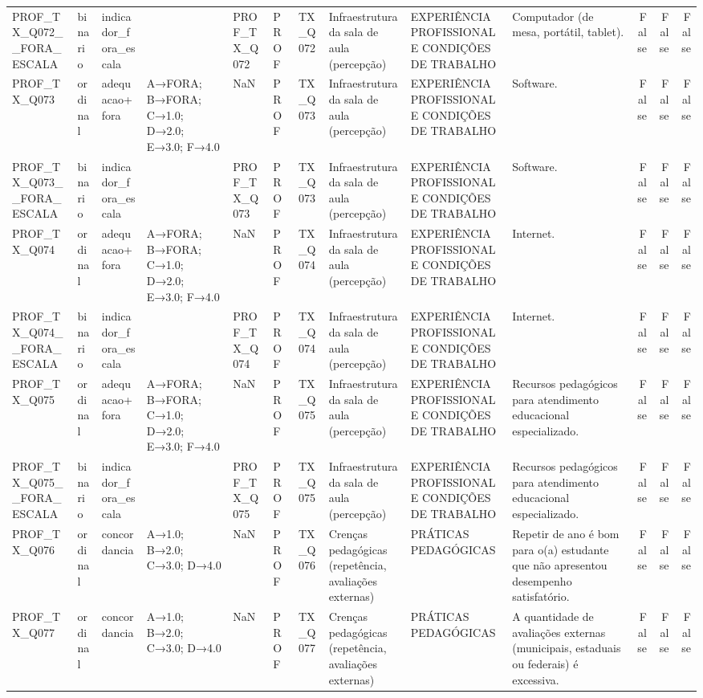 \begin{tabular}{llllllllllrrr}
PROF\_TX\_Q072\_\_FORA\_ESCALA & binario & indicador\_fora\_escala &  & PROF\_TX\_Q072 & PROF & TX\_Q072 & Infraestrutura da sala de aula (percepção) & EXPERIÊNCIA PROFISSIONAL E CONDIÇÕES DE TRABALHO & Computador (de mesa, portátil, tablet). & False & False & False \\
PROF\_TX\_Q073 & ordinal & adequacao+fora & A→FORA; B→FORA; C→1.0; D→2.0; E→3.0; F→4.0 & NaN & PROF & TX\_Q073 & Infraestrutura da sala de aula (percepção) & EXPERIÊNCIA PROFISSIONAL E CONDIÇÕES DE TRABALHO & Software. & False & False & False \\
PROF\_TX\_Q073\_\_FORA\_ESCALA & binario & indicador\_fora\_escala &  & PROF\_TX\_Q073 & PROF & TX\_Q073 & Infraestrutura da sala de aula (percepção) & EXPERIÊNCIA PROFISSIONAL E CONDIÇÕES DE TRABALHO & Software. & False & False & False \\
PROF\_TX\_Q074 & ordinal & adequacao+fora & A→FORA; B→FORA; C→1.0; D→2.0; E→3.0; F→4.0 & NaN & PROF & TX\_Q074 & Infraestrutura da sala de aula (percepção) & EXPERIÊNCIA PROFISSIONAL E CONDIÇÕES DE TRABALHO & Internet. & False & False & False \\
PROF\_TX\_Q074\_\_FORA\_ESCALA & binario & indicador\_fora\_escala &  & PROF\_TX\_Q074 & PROF & TX\_Q074 & Infraestrutura da sala de aula (percepção) & EXPERIÊNCIA PROFISSIONAL E CONDIÇÕES DE TRABALHO & Internet. & False & False & False \\
PROF\_TX\_Q075 & ordinal & adequacao+fora & A→FORA; B→FORA; C→1.0; D→2.0; E→3.0; F→4.0 & NaN & PROF & TX\_Q075 & Infraestrutura da sala de aula (percepção) & EXPERIÊNCIA PROFISSIONAL E CONDIÇÕES DE TRABALHO & Recursos pedagógicos para atendimento educacional especializado. & False & False & False \\
PROF\_TX\_Q075\_\_FORA\_ESCALA & binario & indicador\_fora\_escala &  & PROF\_TX\_Q075 & PROF & TX\_Q075 & Infraestrutura da sala de aula (percepção) & EXPERIÊNCIA PROFISSIONAL E CONDIÇÕES DE TRABALHO & Recursos pedagógicos para atendimento educacional especializado. & False & False & False \\
PROF\_TX\_Q076 & ordinal & concordancia & A→1.0; B→2.0; C→3.0; D→4.0 & NaN & PROF & TX\_Q076 & Crenças pedagógicas (repetência, avaliações externas) & PRÁTICAS PEDAGÓGICAS & Repetir de ano é bom para o(a) estudante que não apresentou desempenho satisfatório. & False & False & False \\
PROF\_TX\_Q077 & ordinal & concordancia & A→1.0; B→2.0; C→3.0; D→4.0 & NaN & PROF & TX\_Q077 & Crenças pedagógicas (repetência, avaliações externas) & PRÁTICAS PEDAGÓGICAS & A quantidade de avaliações externas (municipais, estaduais ou federais) é excessiva. & False & False & False \\

\end{tabular}
